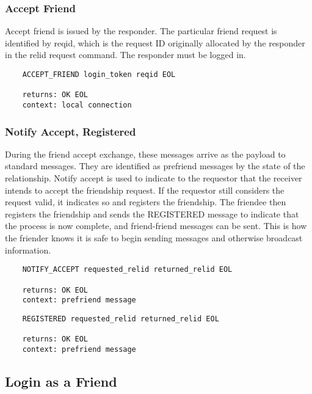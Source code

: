 \documentclass[letterpaper,11pt,oneside]{article}
\begin{document}
\subsubsection{Accept Friend}

Accept friend is issued by the responder. The particular friend request is
identified by reqid, which is the request ID originally allocated by the
responder in the relid request command. The responder must be logged in.

\vspace{10pt}
\begin{verbatim}
    ACCEPT_FRIEND login_token reqid EOL

    returns: OK EOL
    context: local connection
\end{verbatim}
\vspace{10pt}

\subsubsection{Notify Accept, Registered}

During the friend accept exchange, these messages arrive as the payload to
standard messages. They are identified as prefriend messages by the state of the
relationship. Notify accept is used to indicate to the requestor that the
receiver intends to accept the friendship request. If the requestor still
considers the request valid, it indicates so and registers the friendship. The
friendee then registers the friendship and sends the REGISTERED message to
indicate that the process is now complete, and friend-friend messages can be
sent. This is how the friender knows it is safe to begin sending messages and
otherwise broadcast information.

\vspace{10pt}
\begin{verbatim}
    NOTIFY_ACCEPT requested_relid returned_relid EOL

    returns: OK EOL
    context: prefriend message
\end{verbatim}
\vspace{10pt}

\vspace{10pt}
\begin{verbatim}
    REGISTERED requested_relid returned_relid EOL

    returns: OK EOL
    context: prefriend message
\end{verbatim}

\subsection{Login as a Friend}
\end{document}
